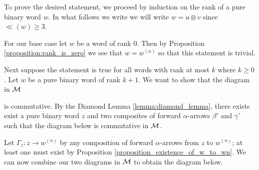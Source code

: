 \begin{prf}
    To prove the desired statement, we proceed by induction 
    on the rank of a pure binary word $w$. 
    In what follows we write we will write $w = u \otimes v$ since $\ll(w) \ge 3$. 
    
    For our base case let $w$ be a word of rank 0. Then by Proposition \ref{proposition:rank_is_zero} 
    we see that $w = w^{(n)}$ so that this statement is trivial. 

    Next suppose the statement is true for all words with rank at 
    most $k$ where $k \ge 0$. Let $w$ be a pure binary word of rank $k+1$.
    We want to show that the diagram in $\mathcal{M}$
    \begin{center}
    \end{center}
    is commutative. By the Diamond Lemma \ref{lemma:diamond_lemma}, 
    there exists exist a pure binary word $z$ and two composites of 
    forward $\alpha$-arrows $\beta'$ and $\gamma'$ such that the diagram below 
    is commutative in $\mathcal{M}$. 
    \begin{center}
    \end{center}
    Let $\Gamma_z: z \to w^{(n)}$ by any composition of forward $\alpha$-arrows from $z$ to $w^{(n)}$; 
    at least one must exist by Proposition \ref{proposition_existence_of_w_to_wn}. 
    We can now combine our two diagrams in $\mathcal{M}$ to obtain the diagram below. 

\end{prf}
